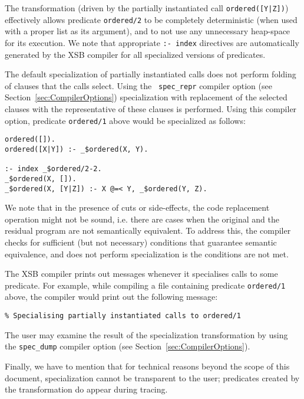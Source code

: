 The transformation (driven by the partially instantiated call
{\tt ordered([Y|Z])}) effectively allows predicate {\tt ordered/2}
to be completely deterministic (when used with a proper list as its
argument), and to not use any unnecessary heap-space for its
execution.  We note that appropriate {\tt :- index} directives are
automatically generated by the XSB compiler for all specialized
versions of predicates.

The default specialization of partially instantiated calls does not
perform folding of clauses that the calls select.  Using the {\tt
  spec\_repr} compiler option (see Section~\ref{sec:CompilerOptions})
specialization with replacement of the selected clauses with the
representative of these clauses is performed.  Using this compiler
option, predicate {\tt ordered/1} above would be specialized as
follows:
\begin{center}
\begin{minipage}{4.1in}
\begin{verbatim}
ordered([]).
ordered([X|Y]) :- _$ordered(X, Y).

:- index _$ordered/2-2.
_$ordered(X, []).
_$ordered(X, [Y|Z]) :- X @=< Y, _$ordered(Y, Z).
\end{verbatim}
\end{minipage}
\end{center}
We note that in the presence of cuts or side-effects, the code
replacement operation might not be sound, i.e.  there are cases when
the original and the residual program are not semantically equivalent.
To address this, the compiler checks for sufficient (but not
necessary) conditions that guarantee semantic equivalence, and does
not perform specialization is the conditions are not met.

The XSB compiler prints out messages whenever it specialises
calls to some predicate.  For example, while compiling a file
containing predicate {\tt ordered/1} above, the compiler would print
out the following message:
\begin{center}
{\tt	\% Specialising partially instantiated calls to ordered/1}
\end{center}
The user may examine the result of the specialization transformation
by using the {\tt spec\_dump} compiler option
(see Section~\ref{sec:CompilerOptions}).

Finally, we have to mention that for technical reasons beyond the scope of
this document, specialization cannot be transparent to the user; predicates
created by the transformation do appear during tracing.



